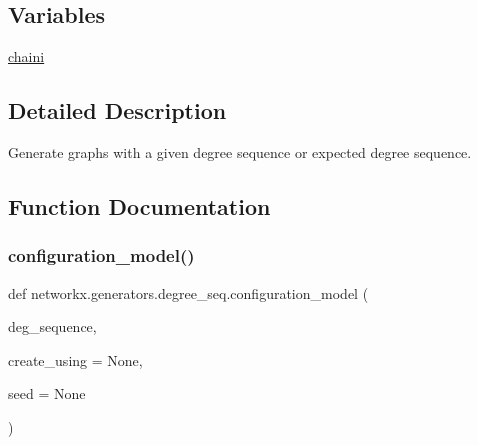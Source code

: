 \subsection*{Variables}
\begin{DoxyCompactItemize}
\item 
\hyperlink{namespacenetworkx_1_1generators_1_1degree__seq_a72aeda943ae7529b7d934d17e6630338}{chaini}
\end{DoxyCompactItemize}


\subsection{Detailed Description}
\begin{DoxyVerb}Generate graphs with a given degree sequence or expected degree sequence.
\end{DoxyVerb}
 

\subsection{Function Documentation}
\mbox{\label{namespacenetworkx_1_1generators_1_1degree__seq_a49e1c606f04d5437eafb94b6f71a80b1}} 
\subsubsection{\texorpdfstring{configuration\+\_\+model()}{configuration\_model()}}
{\footnotesize\ttfamily def networkx.\+generators.\+degree\+\_\+seq.\+configuration\+\_\+model (\begin{DoxyParamCaption}\item[{}]{deg\+\_\+sequence,  }\item[{}]{create\+\_\+using = {\ttfamily None},  }\item[{}]{seed = {\ttfamily None} }\end{DoxyParamCaption})}

